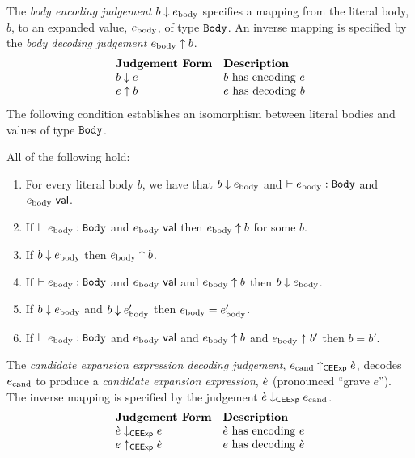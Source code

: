 {{{{The \emph{body encoding judgement} $b \downarrow e_\text{body}$ specifies a mapping from the literal body, $b$, to an expanded value, $e_\text{body}$, of type $\mathtt{Body}$. An inverse mapping is specified by the \emph{body decoding judgement} $e_\text{body} \uparrow b$.
\[\begin{array}{ll}
\textbf{Judgement Form} & \textbf{Description}\\
b \downarrow e & \text{$b$ has encoding $e$}\\
e \uparrow b & \text{$e$ has decoding $b$}
\end{array}\]
The following condition establishes an isomorphism between literal bodies and values of type $\mathtt{Body}$.
\begin{condition} All of the following hold:
\begin{enumerate}
\item For every literal body $b$, we have that $b \downarrow e_\text{body}$ and $\vdash e_\text{body} : \mathtt{Body}$ and $e_\text{body}~\mathsf{val}$.
\item If $\vdash e_\text{body} : \mathtt{Body}$ and $e_\text{body}~\mathsf{val}$ then $e_\text{body} \uparrow b$ for some $b$.
\item If $b \downarrow e_\text{body}$ then $e_\text{body} \uparrow b$.
\item If $\vdash e_\text{body} : \mathtt{Body}$ and $e_\text{body}~\mathsf{val}$ and $e_\text{body} \uparrow b$ then $b \downarrow e_\text{body}$. 
\item If $b \downarrow e_\text{body}$ and $b \downarrow e_\text{body}'$ then $e_\text{body} = e_\text{body}'$.
\item If $\vdash e_\text{body} : \mathtt{Body}$ and $e_\text{body}~\mathsf{val}$ and $e_\text{body} \uparrow b$ and $e_\text{body} \uparrow b'$ then $b=b'$.
\end{enumerate}
\end{condition}

The \emph{candidate expansion expression decoding judgement}, $e_\text{cand} \uparrow_\mathsf{CEExp} \grave{e}$, decodes $e_\text{cand}$ to produce a \emph{candidate expansion expression}, $\grave{e}$  (pronounced ``grave $e$''). 
The inverse mapping is specified by the judgement $\grave{e} \downarrow_\mathsf{CEExp} e_\text{cand}$. 
\[\begin{array}{ll}
\textbf{Judgement Form} & \textbf{Description}\\
\grave{e} \downarrow_\mathsf{CEExp} e & \text{$\grave{e}$ has encoding $e$}\\
e \uparrow_\mathsf{CEExp} \grave{e} & \text{$e$ has decoding $\grave{e}$}
\end{array}\]

}}}}
